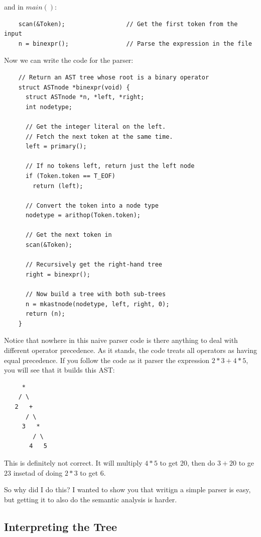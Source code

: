 \documentclass[journal, onecolumn, 12pt]{IEEEtran}
\begin{document}
and in $main()$:

\begin{lstlisting}
    scan(&Token);                 // Get the first token from the input
    n = binexpr();                // Parse the expression in the file
\end{lstlisting}

Now we can write the code for the parser:

\begin{lstlisting}
    // Return an AST tree whose root is a binary operator
    struct ASTnode *binexpr(void) {
      struct ASTnode *n, *left, *right;
      int nodetype;

      // Get the integer literal on the left.
      // Fetch the next token at the same time.
      left = primary();

      // If no tokens left, return just the left node
      if (Token.token == T_EOF)
        return (left);

      // Convert the token into a node type
      nodetype = arithop(Token.token);

      // Get the next token in
      scan(&Token);

      // Recursively get the right-hand tree
      right = binexpr();

      // Now build a tree with both sub-trees
      n = mkastnode(nodetype, left, right, 0);
      return (n);
    }
\end{lstlisting}

Notice that nowhere in this naive parser code is there anything to deal with different operator precedence. As it stands, the code treats all operators as having equal precedence. If you follow the code as it parser the expression $2*3+4*5$, you will see that it builds this AST:

\begin{lstlisting}
     *
    / \
   2   +
      / \
     3   *
        / \
       4   5
\end{lstlisting}

This is definitely not correct. It will multiply $4*5$ to get 20, then do $3+20$ to ge $23$ insetad of doing $2*3$ to get 6.

So why did I do this? I wanted to show you that writign a simple parser is easy, but getting it to also do the semantic analysis is harder.

\subsection{Interpreting the Tree}
\end{document}
